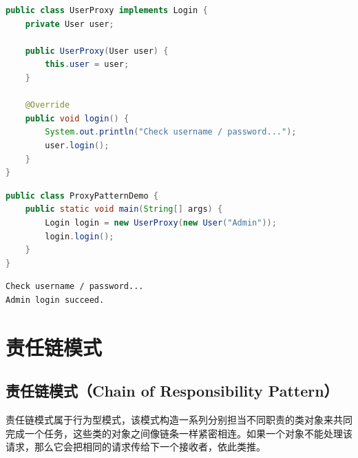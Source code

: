 \begin{lstlisting}[language=Java, title=UserProxy.java]
public class UserProxy implements Login {
    private User user;

    public UserProxy(User user) {
        this.user = user;
    }

    @Override
    public void login() {
        System.out.println("Check username / password...");
        user.login();
    }
}
\end{lstlisting}

\begin{lstlisting}[language=Java, title=ProxyPatternDemo.java]
public class ProxyPatternDemo {
    public static void main(String[] args) {
        Login login = new UserProxy(new User("Admin"));
        login.login();
    }
}
\end{lstlisting}

\begin{tcolorbox}
    \begin{verbatim}
Check username / password...
Admin login succeed.
\end{verbatim}
\end{tcolorbox}

\newpage

\section{责任链模式}

\subsection{责任链模式（Chain of Responsibility Pattern）}

责任链模式属于行为型模式，该模式构造一系列分别担当不同职责的类对象来共同完成一个任务，这些类的对象之间像链条一样紧密相连。如果一个对象不能处理该请求，那么它会把相同的请求传给下一个接收者，依此类推。\\

\\

